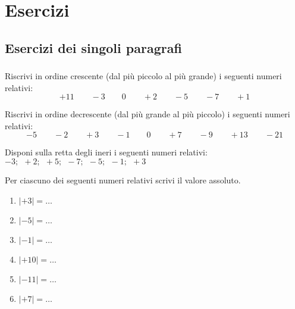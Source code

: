 
\section{Esercizi}

\subsection{Esercizi dei singoli paragrafi}

\subsubsection*{}


\begin{esercizio}
 \label{ese:2.1}
Riscrivi in ordine crescente (dal più piccolo al più grande) i seguenti 
numeri 
relativi:
\[+11\qquad-3\qquad0\qquad+2\qquad-5\qquad-7\qquad+1\]
\end{esercizio}

\begin{esercizio}
 \label{ese:2.2}
Riscrivi in ordine decrescente (dal più grande al più piccolo) i seguenti 
numeri 
relativi:
\[-5\qquad-2\qquad+3\qquad-1\qquad0\qquad+7\qquad-9\qquad+13\qquad-21\]
\end{esercizio}

\begin{esercizio}
 \label{ese:2.3}
Disponi sulla retta degli ineri i seguenti numeri relativi:
\(-3;~~ +2;~~ +5;~~ -7;~~ -5;~~ -1;~~ +3\)
\begin{center}
\esec
\end{center}

\end{esercizio}

\begin{esercizio}
 \label{ese:2.4}
Per ciascuno dei seguenti numeri relativi scrivi il valore assoluto.
\begin{multicols}{3}
\begin{enumerate}[noitemsep, label=(\alph*)]
 \item \(|+3|=\ldots\)
 \item \(|-5|=\ldots\)
 \item \(|-1|=\ldots\)
 \item \(|+10|=\ldots\)
 \item \(|-11|=\ldots\)
 \item \(|+7|=\ldots\)
\end{enumerate}
\end{multicols}
\end{esercizio}

